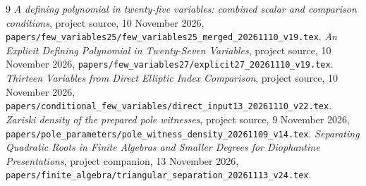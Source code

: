 \documentclass[11pt,a4paper]{article}
\theoremstyle{remark}\newtheorem{remark}[theorem]{Remark}
\begin{document}
\begin{thebibliography}{9}
\emph{A defining polynomial in twenty-five variables:
combined scalar and comparison conditions}, project source, 10 November 2026,
\nolinkurl{papers/few_variables25/few_variables25_merged_20261110_v19.tex}.
\emph{An Explicit Defining Polynomial in Twenty-Seven Variables}, project source, 10 November 2026,
\nolinkurl{papers/few_variables27/explicit27_20261110_v19.tex}.
\emph{Thirteen Variables from Direct Elliptic Index
Comparison}, project source, 10 November 2026,
\nolinkurl{papers/conditional_few_variables/direct_input13_20261110_v22.tex}.
\emph{Zariski density of the prepared pole witnesses},
project source, 9 November 2026,
\nolinkurl{papers/pole_parameters/pole_witness_density_20261109_v14.tex}.
\emph{Separating Quadratic Roots in Finite Algebras and Smaller Degrees for Diophantine Presentations},
project companion, 13 November 2026,
\nolinkurl{papers/finite_algebra/triangular_separation_20261113_v24.tex}.
\end{thebibliography}
\end{document}
